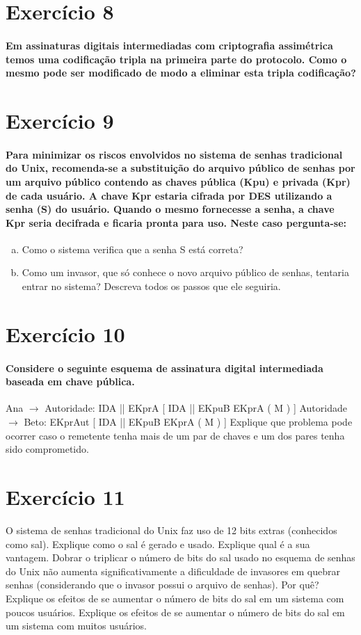 \documentclass[10pt,a4paper]{report}
\begin{document}
\section*{Exercício 8}
\paragraph{ Em assinaturas digitais intermediadas com criptografia assimétrica temos uma codificação tripla na primeira parte do protocolo. Como o mesmo pode ser modificado de modo a eliminar esta tripla codificação?}

\section*{Exercício 9}
\paragraph{ Para minimizar os riscos envolvidos no sistema de senhas tradicional do Unix, recomenda-se a substituição do arquivo público de senhas por um arquivo público contendo as chaves pública (Kpu) e privada (Kpr) de cada usuário. A chave Kpr estaria cifrada por DES utilizando a senha (S) do usuário. Quando o mesmo fornecesse a senha, a chave Kpr seria decifrada e ficaria pronta para uso. Neste caso pergunta-se:}
\begin{enumerate}[(a)]
\item Como o sistema verifica que a senha S está correta?
\item Como um invasor, que só conhece o novo arquivo público de senhas, tentaria entrar no sistema? Descreva todos os passos que ele seguiria.
\end{enumerate}
\section*{Exercício 10}
\paragraph{ Considere o seguinte esquema de assinatura digital intermediada baseada em chave pública.}
Ana $\rightarrow$ Autoridade: IDA || EKprA [ IDA || EKpuB { EKprA ( M ) } ]
Autoridade $\rightarrow$ Beto: EKprAut [ IDA || EKpuB { EKprA ( M ) } ]
Explique que problema pode ocorrer caso o remetente tenha mais de um par de chaves e um dos pares tenha sido comprometido.

\section*{Exercício 11}
O sistema de senhas tradicional do Unix faz uso de 12 bits extras (conhecidos como sal).
Explique como o sal é gerado e usado.
Explique qual é a sua vantagem.
Dobrar o triplicar o número de bits do sal usado no esquema de senhas do Unix não aumenta significativamente a dificuldade de invasores em quebrar senhas (considerando que o invasor possui o arquivo de senhas). Por quê?
Explique os efeitos de se aumentar o número de bits do sal em um sistema com poucos usuários.
Explique os efeitos de se aumentar o número de bits do sal em um sistema com muitos usuários.
\end{document}
